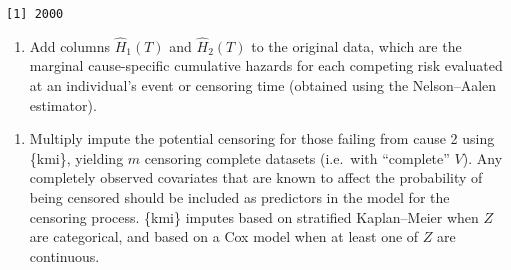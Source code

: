 \documentclass[
  12pt,
  a4paper,
]{article}
\newenvironment{Shaded}{\begin{snugshade}}{\end{snugshade}}
\newcommand{\AttributeTok}[1]{\textcolor[rgb]{0.40,0.45,0.13}{#1}}
\newcommand{\CommentTok}[1]{\textcolor[rgb]{0.37,0.37,0.37}{#1}}
\newcommand{\DecValTok}[1]{\textcolor[rgb]{0.68,0.00,0.00}{#1}}
\newcommand{\FunctionTok}[1]{\textcolor[rgb]{0.28,0.35,0.67}{#1}}
\newcommand{\NormalTok}[1]{\textcolor[rgb]{0.00,0.23,0.31}{#1}}
\newcommand{\OtherTok}[1]{\textcolor[rgb]{0.00,0.23,0.31}{#1}}
\newcommand{\SpecialCharTok}[1]{\textcolor[rgb]{0.37,0.37,0.37}{#1}}
\newcommand{\StringTok}[1]{\textcolor[rgb]{0.13,0.47,0.30}{#1}}
\providecommand{\tightlist}{%
  \setlength{\itemsep}{0pt}\setlength{\parskip}{0pt}}\usepackage{longtable,booktabs,array}
\begin{document}
\begin{verbatim}
[1] 2000
\end{verbatim}

\begin{enumerate}
\def\labelenumi{\arabic{enumi}.}
\tightlist
\item
  Add columns \(\hat{H}_1(T)\) and \(\hat{H}_2(T)\) to the original
  data, which are the marginal cause-specific cumulative hazards for
  each competing risk evaluated at an individual's event or censoring
  time (obtained using the Nelson--Aalen estimator).
\end{enumerate}

\begin{Shaded}
\end{Shaded}

\begin{enumerate}
\def\labelenumi{\arabic{enumi}.}
\setcounter{enumi}{1}
\tightlist
\item
  Multiply impute the potential censoring for those failing from cause 2
  using \{kmi\}, yielding \(m\) censoring complete datasets (i.e.~with
  ``complete'' \(V\)). Any completely observed covariates that are known
  to affect the probability of being censored should be included as
  predictors in the model for the censoring process. \{kmi\} imputes
  based on stratified Kaplan--Meier when \(Z\) are categorical, and
  based on a Cox model when at least one of \(Z\) are continuous.
\end{enumerate}
\end{document}
